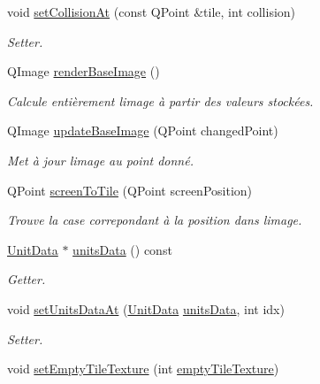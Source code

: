 \begin{DoxyCompactItemize}
void \hyperlink{class_editor_level_a043669a22f9a5eb598c2157603ecc3a9}{set\+Collision\+At} (const Q\+Point \&tile, int collision)
\begin{DoxyCompactList}\small\item\em Setter. \end{DoxyCompactList}\item 
Q\+Image \hyperlink{class_editor_level_a22e354423f919cbc72baa6a5b3839e2c}{render\+Base\+Image} ()
\begin{DoxyCompactList}\small\item\em Calcule entièrement l\textquotesingle{}image à partir des valeurs stockées. \end{DoxyCompactList}\item 
Q\+Image \hyperlink{class_editor_level_a8e4d29469af6e4b7385099b55ace342a}{update\+Base\+Image} (Q\+Point changed\+Point)
\begin{DoxyCompactList}\small\item\em Met à jour l\textquotesingle{}image au point donné. \end{DoxyCompactList}\item 
Q\+Point \hyperlink{class_editor_level_abc294de71bda94b177aa2d00968a0e30}{screen\+To\+Tile} (Q\+Point screen\+Position)
\begin{DoxyCompactList}\small\item\em Trouve la case correpondant à la position dans l\textquotesingle{}image. \end{DoxyCompactList}\item 
\hyperlink{struct_unit_data__str}{Unit\+Data} $\ast$ \hyperlink{class_editor_level_a7f940dbe1b6700b1d46e1fb7e2babd7b}{units\+Data} () const 
\begin{DoxyCompactList}\small\item\em Getter. \end{DoxyCompactList}\item 
void \hyperlink{class_editor_level_afa3508ad464eb7d64b125362810f6587}{set\+Units\+Data\+At} (\hyperlink{struct_unit_data__str}{Unit\+Data} \hyperlink{class_editor_level_a7f940dbe1b6700b1d46e1fb7e2babd7b}{units\+Data}, int idx)
\begin{DoxyCompactList}\small\item\em Setter. \end{DoxyCompactList}\item 
void \hyperlink{class_editor_level_a310f8584dad7701e9eae52e0aac545fc}{set\+Empty\+Tile\+Texture} (int \hyperlink{class_editor_level_a6c85fe38496b6818f46e01769dac0149}{empty\+Tile\+Texture})

\end{DoxyCompactItemize}
